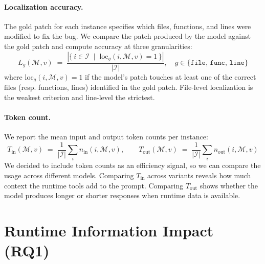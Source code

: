 \paragraph{Localization accuracy.} The gold patch for each instance specifies which files, functions, and lines were modified to fix the bug. We compare the patch produced by the model against the gold patch and compute accuracy at three granularities:
\[
  L_g(\mathcal{M}, v) \;=\; \frac{|\{\, i \in \mathcal{I} \;\mid\; \mathrm{loc}_g(i, \mathcal{M}, v) = 1 \,\}|}{|\mathcal{I}|}, \quad g \in \{\texttt{file},\, \texttt{func},\, \texttt{line}\}
\]
where $\mathrm{loc}_g(i, \mathcal{M}, v) = 1$ if the model's patch touches at least one of the correct files (resp. functions, lines) identified in the gold patch. File-level localization is the weakest criterion and line-level the strictest.

\paragraph{Token count.} We report the mean input and output token counts per instance:
\[
  T_{\mathrm{in}}(\mathcal{M}, v) \;=\; \frac{1}{|\mathcal{I}|}\sum_i n_{\mathrm{in}}(i, \mathcal{M}, v), \qquad
  T_{\mathrm{out}}(\mathcal{M}, v) \;=\; \frac{1}{|\mathcal{I}|}\sum_i n_{\mathrm{out}}(i, \mathcal{M}, v)
\]
We decided to include token counts as an efficiency signal, so we can compare the usage across different models. Comparing $T_{\mathrm{in}}$ across variants reveals how much context the runtime tools add to the prompt. Comparing $T_{\mathrm{out}}$ shows whether the model produces longer or shorter responses when runtime data is available.

\section{Runtime Information Impact (RQ1)}
\label{sec:rq1}

